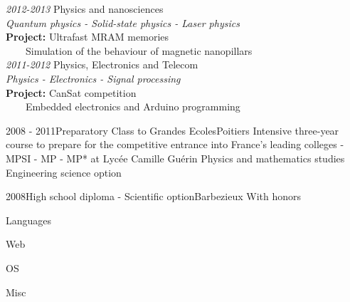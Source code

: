 \documentclass[a4paper]{genard-cv}
\begin{document}
\begin{body}
\begin{entry}
			\textit{2012-2013} Physics and nanosciences\\
			\textit{Quantum physics - Solid-state physics - Laser physics}\\
			\textbf{Project:} Ultrafast MRAM memories\\
			~~~~Simulation of the behaviour of magnetic nanopillars
			\medskip\\

			\textit{2011-2012} Physics, Electronics and Telecom\\
			\textit{Physics - Electronics - Signal processing}\\
			\textbf{Project:} CanSat competition\\
			~~~~Embedded electronics and Arduino programming
		\end{entry}
		\begin{entry}
			{2008 - 2011}{Preparatory Class to Grandes Ecoles}{Poitiers}
			{Intensive three-year course to prepare for the competitive entrance
			into France’s leading colleges - MPSI - MP - MP* at Lycée Camille Guérin}
			Physics and mathematics studies\\
			Engineering science option
		\end{entry}
		\begin{entry}
			{2008}{High school diploma - Scientific option}{Barbezieux}
			{With honors}
		\end{entry}

\end{body}

\begin{aside}

	\begin{about}
	\end{about}\noindent

	\skills
	
	\begin{skillgroup}{Languages}
	\end{skillgroup}

	\begin{skillgroup}{Web}
	\end{skillgroup}

	\begin{skillgroup}{OS}
	\end{skillgroup}

	\begin{skillgroup}{Misc}
	\end{skillgroup}

	\skillscaption
\end{aside}
\end{document}

